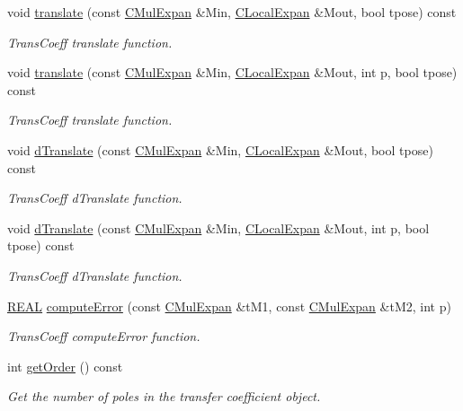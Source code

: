 \begin{DoxyCompactItemize}
\item 
void \hyperlink{classCTransCoeff_a1d1d9ced218d76afb362aa1f7d5a27da}{translate} (const \hyperlink{classCMulExpan}{C\-Mul\-Expan} \&Min, \hyperlink{classCLocalExpan}{C\-Local\-Expan} \&Mout, bool tpose) const 
\begin{DoxyCompactList}\small\item\em Trans\-Coeff translate function. \end{DoxyCompactList}\item 
void \hyperlink{classCTransCoeff_ae2fdedf60a9c783701c45784ab253ad9}{translate} (const \hyperlink{classCMulExpan}{C\-Mul\-Expan} \&Min, \hyperlink{classCLocalExpan}{C\-Local\-Expan} \&Mout, int p, bool tpose) const 
\begin{DoxyCompactList}\small\item\em Trans\-Coeff translate function. \end{DoxyCompactList}\item 
void \hyperlink{classCTransCoeff_a0443940310cfbc7d0680f0216402d6af}{d\-Translate} (const \hyperlink{classCMulExpan}{C\-Mul\-Expan} \&Min, \hyperlink{classCLocalExpan}{C\-Local\-Expan} \&Mout, bool tpose) const 
\begin{DoxyCompactList}\small\item\em Trans\-Coeff d\-Translate function. \end{DoxyCompactList}\item 
void \hyperlink{classCTransCoeff_a12e162e5ba7b029ad5994a725d906a28}{d\-Translate} (const \hyperlink{classCMulExpan}{C\-Mul\-Expan} \&Min, \hyperlink{classCLocalExpan}{C\-Local\-Expan} \&Mout, int p, bool tpose) const 
\begin{DoxyCompactList}\small\item\em Trans\-Coeff d\-Translate function. \end{DoxyCompactList}\item 
\hyperlink{util_8h_a5821460e95a0800cf9f24c38915cbbde}{R\-E\-A\-L} \hyperlink{classCTransCoeff_a06deb02545ce41e66a0c6b9e7e13910f}{compute\-Error} (const \hyperlink{classCMulExpan}{C\-Mul\-Expan} \&t\-M1, const \hyperlink{classCMulExpan}{C\-Mul\-Expan} \&t\-M2, int p)
\begin{DoxyCompactList}\small\item\em Trans\-Coeff compute\-Error function. \end{DoxyCompactList}\item 
int \hyperlink{classCTransCoeff_a3c10d7ee9ead85dab5c5d2301cb6bb81}{get\-Order} () const 
\begin{DoxyCompactList}\small\item\em Get the number of poles in the transfer coefficient object. \end{DoxyCompactList}\item 

\end{DoxyCompactItemize}
